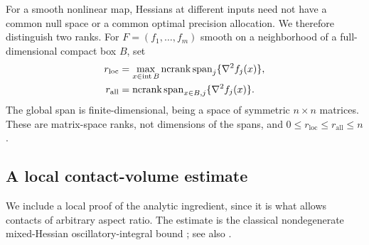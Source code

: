 For a smooth nonlinear map, Hessians at different inputs need not have
a common null space or a common optimal precision allocation. We
therefore distinguish two ranks. For $F=(f_1,\ldots,f_m)$ smooth on a
neighborhood of a full-dimensional compact box $B$, set
\begin{align*}
 r_{\mathrm{loc}}&=\max_{x\in\operatorname{int}B}
       \operatorname{ncrank}\operatorname{span}_j\{\nabla^2 f_j(x)\},\\
 r_{\mathrm{all}}&=\operatorname{ncrank}\operatorname{span}_{x\in B,j}
                                      \{\nabla^2 f_j(x)\}.
\end{align*}
The global span is finite-dimensional, being a space of symmetric
$n\times n$ matrices. These are matrix-space ranks, not dimensions of
the spans, and $0\le r_{\mathrm{loc}}\le r_{\mathrm{all}}\le n$.

\subsection{A local contact-volume estimate}

We include a local proof of the analytic ingredient, since it is what
allows contacts of arbitrary aspect ratio. The estimate is the classical
nondegenerate mixed-Hessian oscillatory-integral bound
\citep[Theorem 1.1]{hormander1973}; see also
\citet[Theorem A, pp.~50--51]{wolff2002}.


